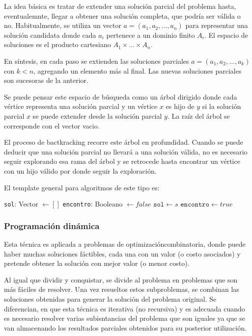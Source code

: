 La idea básica es tratar de extender una solución parcial del problema hasta, eventualemnte, llegar a obtener una solución completa, que podría ser válida o no. Habitualmente, se utiliza un vector \(a=(a_1,a_2,\dots,a_n)\) para representar una solución candidata donde cada \(a_i\) pertenece a un dominio finito \(A_i\). El espacio de soluciones es el producto cartesiano \(A_1\times\dots\times A_n\).

En síntesis, en cada paso se extienden las soluciones parciales \(a=(a_1,a_2,\dots,a_k)\) con \(k < n\), agregando un elemento más al final. Las nuevas soluciones parciales son sucesoras de la anterior.

Se puede pensar este espacio de búsqueda como un árbol dirigido donde cada vértice representa una solución parcial y un vértice \(x\) es hijo de \(y\) si la solución parcial \(x\) se puede extender desde la solución parcial \(y\). La raíz del árbol se corresponde con el vector vacio.

El proceso de bactkracking recorre este árbol en profundidad. Cuando se puede deducir que una solución parcial no llevará a una solución válida, no es necesario seguir explorando esa rama del árbol y se retrocede hasta encontrar un vértice con un hijo válido por donde seguir la exploración. 

El template general para algoritmos de este tipo es: 

\begin{algorithmic}
	\State \texttt{sol}: Vector \(\gets [] \)
	\State \texttt{encontro}: Booleano \(\gets false \)
	\State\(\texttt{sol} \gets s\)
	\State \(\texttt{encontro} \gets true\)
	\Else
	~\Return
	\EndIf
	\EndFor
	\EndIf
	\EndFunction
\end{algorithmic}

\subsubsection{Programación dinámica}
Esta técnica es aplicada a problemas de optimizacióncombinatoria, donde puede haber muchas soluciones fáctibles, cada una con un valor (o costo asociados) y pretende obtener la solución con mejor valor (o menor costo).

Al igual que dividir y conquistar, se divide al problema en problemas que son más fáciles de resolver. Una vez resueltos estos subproblemas, se combinan las soluciones obtenidas para generar la solución del problema original. Se diferencian, en que esta técnica es iterativa (no recursiva) y es adecuada cuando es necesario resolver varias subisntancias del problema que son iguales ya que se van almacenando los resultados parciales obtenidos para su posterior utilización.

